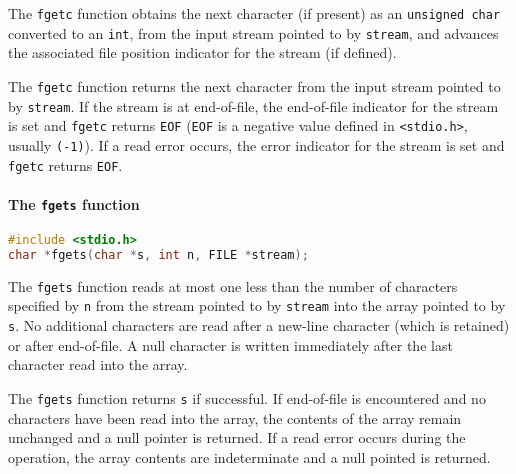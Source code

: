 The \texttt{fgetc} function obtains the next character (if present) as an
\texttt{unsigned char} converted to an \texttt{int}, from the input stream
pointed to by \texttt{stream}, and advances the associated file position
indicator for the stream (if defined). 

The \texttt{fgetc} function returns the next character from the input stream
pointed to by \texttt{stream}. If the stream is at end-of-file, the end-of-file
indicator for the stream is set and \texttt{fgetc} returns \texttt{EOF}
(\texttt{EOF} is a negative value defined in
\texttt{\textless{}stdio.h\textgreater{}}, usually \texttt{(-1)}). If a read
error occurs, the error indicator for the stream is set and \texttt{fgetc}
returns \texttt{EOF}.

\paragraph{The \texttt{fgets} function}
\lstset{basicstyle=\scriptsize, numbers=left, captionpos=b, tabsize=4}
\begin{lstlisting}[caption=Section \thesection listing \arabic{filecnt},language={C},
breaklines=true,xleftmargin=15pt,label=lst:section\thesection listing\arabic{filecnt}]
#include <stdio.h>
char *fgets(char *s, int n, FILE *stream);
\end{lstlisting}

The \texttt{fgets} function reads at most one less than the number of
characters specified by \texttt{n} from the stream pointed to by
\texttt{stream} into the array pointed to by \texttt{s}. No additional
characters are read after a new-line character (which is retained) or after
end-of-file. A null character is written immediately after the last character
read into the array.

The \texttt{fgets} function returns \texttt{s} if successful. If end-of-file is
encountered and no characters have been read into the array, the contents of
the array remain unchanged and a null pointer is returned. If a read error
occurs during the operation, the array contents are indeterminate and a null
pointed is returned.

